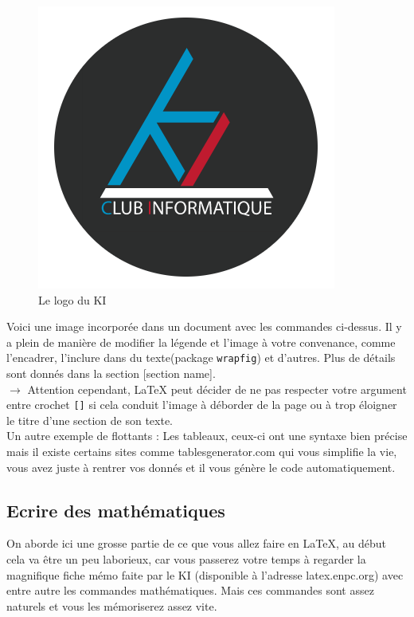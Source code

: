 \documentclass[11pt]{article}				%
\begin{document}
\begin{figure}[h!]
	\centering
	\includegraphics[scale=0.2]{ressources/KI.png}
	\caption{Le logo du KI}
\end{figure}



Voici une image incorporée dans un document avec les commandes ci-dessus. Il y a plein de manière de modifier la légende et l'image à votre convenance, comme l'encadrer, l'inclure dans du texte(package \texttt{wrapfig}) et d'autres. Plus de détails sont donnés dans la section [section name].\\


$\rightarrow$ Attention cependant, LaTeX peut décider de ne pas respecter votre argument entre crochet \texttt{[]} si cela conduit l'image à déborder de la page ou à trop éloigner le titre d'une section de son texte.\\

Un autre exemple de flottants : Les tableaux, ceux-ci ont une syntaxe bien précise mais il existe certains sites comme tablesgenerator.com qui vous simplifie la vie, vous avez juste à rentrer vos donnés et il vous génère le code automatiquement.


\subsection{Ecrire des mathématiques}

On aborde ici une grosse partie de ce que vous allez faire en LaTeX, au début cela va être un peu laborieux, car vous passerez votre temps à regarder la magnifique fiche mémo faite par le KI (disponible à l'adresse latex.enpc.org) avec entre autre les commandes mathématiques. Mais ces commandes sont assez naturels et vous les mémoriserez assez vite.\\
\end{document}
